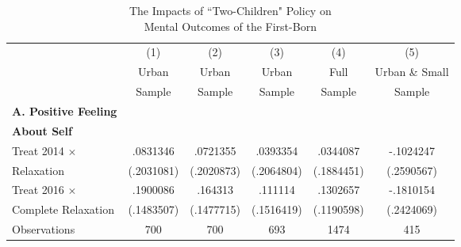 \documentclass[12pt]{extarticle}
\begin{document}
\begin{table}
\centering
\caption{The Impacts of ``Two-Children" Policy on \\ Mental Outcomes of the First-Born} \label{app:childmental}
\begin{threeparttable}
\def\sym#1{\ifmmode^{#1}\else\(^{#1}\)\fi}
\begin{tabular}{l*{5}{c}}
\hline\hline
                    &\multicolumn{1}{c}{(1)}&\multicolumn{1}{c}{(2)}&\multicolumn{1}{c}{(3)}&\multicolumn{1}{c}{(4)}&\multicolumn{1}{c}{(5)}\\
	                &\multicolumn{1}{c}{Urban}&\multicolumn{1}{c}{Urban}&\multicolumn{1}{c}{Urban}&\multicolumn{1}{c}{Full}&\multicolumn{1}{c}{Urban \& Small}\\
		&\multicolumn{1}{c}{Sample}&\multicolumn{1}{c}{Sample}&\multicolumn{1}{c}{Sample}&\multicolumn{1}{c}{Sample}&\multicolumn{1}{c}{Sample}\\
\hline

\textbf{A. Positive Feeling} \\
\qquad \textbf{About Self} \\
Treat 2014 $\times$ &    .0831346   &    .0721355   &    .0393354   &    .0344087   &   -.1024247   \\
\quad 2014 Relaxation     &  (.2031081)   &  (.2020873)   &  (.2064804)   &  (.1884451)   &  (.2590567)   \\
Treat 2016 $\times$ &    .1900086   &     .164313   &     .111114   &    .1302657   &   -.1810154   \\
\quad Complete Relaxation &  (.1483507)   &  (.1477715)   &  (.1516419)   &  (.1190598)   &  (.2424069)   \\
Observations        &         700   &         700   &         693   &        1474   &         415   \\


\end{tabular}
\end{threeparttable}
\end{table}
\end{document}
